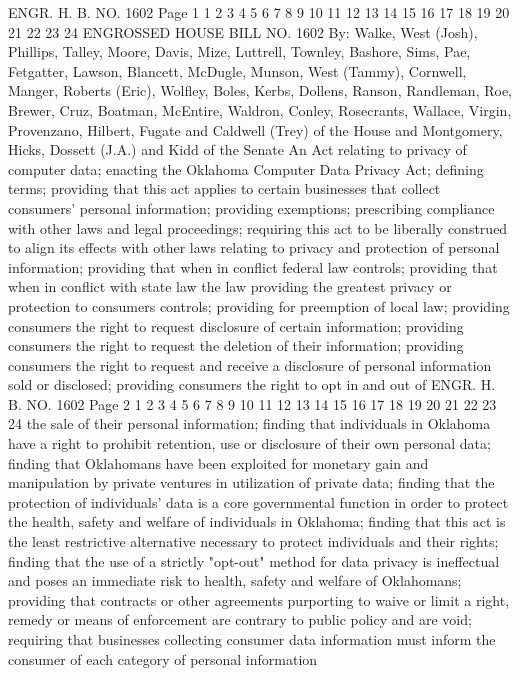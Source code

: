 ENGR. H. B. NO. 1602 Page 1
1
2
3
4
5
6
7
8
9
10
11
12
13
14
15
16
17
18
19
20
21
22
23
24
ENGROSSED HOUSE
BILL NO. 1602 By: Walke, West (Josh),
Phillips, Talley, Moore,
Davis, Mize, Luttrell,
Townley, Bashore, Sims,
Pae, Fetgatter, Lawson,
Blancett, McDugle, Munson,
West (Tammy), Cornwell,
Manger, Roberts (Eric),
Wolfley, Boles, Kerbs,
Dollens, Ranson, Randleman,
Roe, Brewer, Cruz, Boatman,
McEntire, Waldron, Conley,
Rosecrants, Wallace,
Virgin, Provenzano,
Hilbert, Fugate and
Caldwell (Trey) of the
House
and
Montgomery, Hicks, Dossett
(J.A.) and Kidd of the
Senate
An Act relating to privacy of computer data; enacting
the Oklahoma Computer Data Privacy Act; defining
terms; providing that this act applies to certain
businesses that collect consumers' personal
information; providing exemptions; prescribing
compliance with other laws and legal proceedings;
requiring this act to be liberally construed to align
its effects with other laws relating to privacy and
protection of personal information; providing that
when in conflict federal law controls; providing that
when in conflict with state law the law providing the
greatest privacy or protection to consumers controls;
providing for preemption of local law; providing
consumers the right to request disclosure of certain
information; providing consumers the right to request
the deletion of their information; providing
consumers the right to request and receive a
disclosure of personal information sold or disclosed;
providing consumers the right to opt in and out of 
ENGR. H. B. NO. 1602 Page 2
1
2
3
4
5
6
7
8
9
10
11
12
13
14
15
16
17
18
19
20
21
22
23
24
the sale of their personal information; finding that
individuals in Oklahoma have a right to prohibit
retention, use or disclosure of their own personal
data; finding that Oklahomans have been exploited for
monetary gain and manipulation by private ventures in
utilization of private data; finding that the
protection of individuals' data is a core
governmental function in order to protect the health,
safety and welfare of individuals in Oklahoma;
finding that this act is the least restrictive
alternative necessary to protect individuals and
their rights; finding that the use of a strictly
"opt-out" method for data privacy is ineffectual and
poses an immediate risk to health, safety and welfare
of Oklahomans; providing that contracts or other
agreements purporting to waive or limit a right,
remedy or means of enforcement are contrary to public
policy and are void; requiring that businesses
collecting consumer data information must inform the
consumer of each category of personal information
